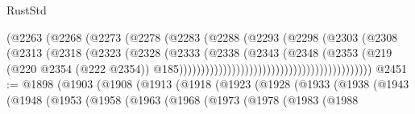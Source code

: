 \begin{lexlean}{RustStd}
\begin{coremodule}
                                                    (@2263
                                                      (@2268
                                                        (@2273
                                                          (@2278
                                                            (@2283
                                                              (@2288
                                                                (@2293
                                                                  (@2298
                                                                    (@2303
                                                                      (@2308
                                                                        (@2313
                                                                          (@2318
                                                                            (@2323
                                                                              (@2328
                                                                                (@2333
                                                                                  (@2338
                                                                                    (@2343
                                                                                      (@2348
                                                                                        (@2353
                                                                                          (@219
                                                                                            (@220
                                                                                              @2354
                                                                                              (@222
                                                                                                @2354))
                                                                                            @185))))))))))))))))))))))))))))))))))))))))))))
@2451 := @1898
    (@1903
      (@1908
        (@1913
          (@1918
            (@1923
              (@1928
                (@1933
                  (@1938
                    (@1943
                      (@1948
                        (@1953
                          (@1958
                            (@1963
                              (@1968
                                (@1973
                                  (@1978
                                    (@1983
                                      (@1988

\end{coremodule}
\end{lexlean}
